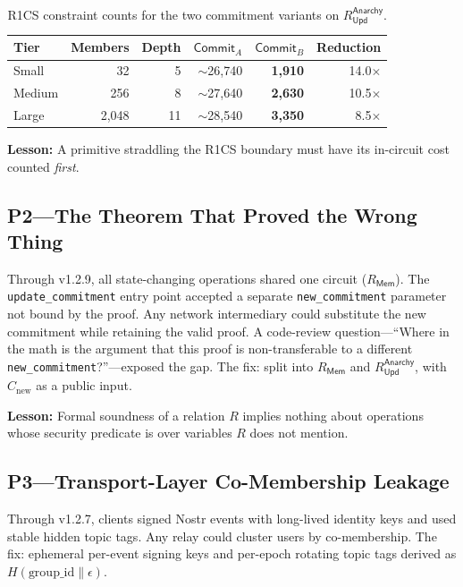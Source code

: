 \documentclass[journal]{IEEEtran}
\newcommand{\Commit}{\mathsf{Commit}}
\newcommand{\Rmem}{R_{\mathsf{Mem}}}
\newcommand{\Rupd}{R_{\mathsf{Upd}}^{\mathsf{Anarchy}}}
\begin{document}
\begin{table}[t]
\centering
\caption{R1CS constraint counts for the two commitment variants on $\Rupd$.}
\label{tab:constraints}
\begin{tabular}{@{}lrrrrr@{}}
\toprule
Tier & Members & Depth & $\Commit_A$ & $\Commit_B$ & Reduction \\
\midrule
Small & 32 & 5 & ${\sim}$26,740 & \textbf{1,910} & 14.0$\times$ \\
Medium & 256 & 8 & ${\sim}$27,640 & \textbf{2,630} & 10.5$\times$ \\
Large & 2,048 & 11 & ${\sim}$28,540 & \textbf{3,350} & 8.5$\times$ \\
\bottomrule
\end{tabular}
\end{table}

\textbf{Lesson:} A primitive straddling the R1CS boundary must have its in-circuit cost counted \emph{first}.

\subsection{P2---The Theorem That Proved the Wrong Thing}
\label{sec:p2}

Through v1.2.9, all state-changing operations shared one circuit ($\Rmem$). The \texttt{update\_commitment} entry point accepted a separate \texttt{new\_commitment} parameter not bound by the proof. Any network intermediary could substitute the new commitment while retaining the valid proof. A code-review question---``Where in the math is the argument that this proof is non-transferable to a different \texttt{new\_commitment}?''---exposed the gap. The fix: split into $\Rmem$ and $\Rupd$, with $C_\text{new}$ as a public input.

\textbf{Lesson:} Formal soundness of a relation $R$ implies nothing about operations whose security predicate is over variables $R$ does not mention.

\subsection{P3---Transport-Layer Co-Membership Leakage}

Through v1.2.7, clients signed Nostr events with long-lived identity keys and used stable hidden topic tags. Any relay could cluster users by co-membership. The fix: ephemeral per-event signing keys and per-epoch rotating topic tags derived as $H(\text{group\_id} \| \epsilon)$.
\end{document}
